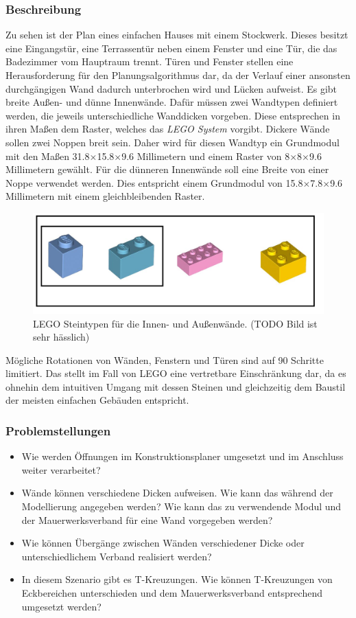 \subsubsection*{Beschreibung}
Zu sehen ist der Plan eines einfachen Hauses mit einem Stockwerk.
Dieses besitzt eine Eingangstür, eine Terrassentür neben einem Fenster und eine Tür, die das Badezimmer vom Hauptraum trennt.
Türen und Fenster stellen eine Herausforderung für den Planungsalgorithmus dar, da der Verlauf einer ansonsten durchgängigen Wand dadurch unterbrochen wird und Lücken aufweist.
Es gibt breite Außen- und dünne Innenwände.
Dafür müssen zwei Wandtypen definiert werden, die jeweils unterschiedliche Wanddicken vorgeben.
Diese entsprechen in ihren Maßen dem Raster, welches das \textit{LEGO System} vorgibt.
Dickere Wände sollen zwei Noppen breit sein.
Daher wird für diesen Wandtyp ein Grundmodul mit den Maßen 31.8$\times$15.8$\times$9.6 Millimetern und einem Raster von 8$\times$8$\times$9.6 Millimetern gewählt.
Für die dünneren Innenwände soll eine Breite von einer Noppe verwendet werden.
Dies entspricht einem Grundmodul von 15.8$\times$7.8$\times$9.6 Millimetern mit einem gleichbleibenden Raster.
\begin{figure}[!ht]
  \centering
  \includegraphics[width=0.6\columnwidth]{fig/scenario1_lego_set.png}
  \caption{LEGO Steintypen für die Innen- und Außenwände. (TODO Bild ist sehr hässlich)}\label{fig:scenarios:Scenario1 Lego Set}
\end{figure}
Mögliche Rotationen von Wänden, Fenstern und Türen sind auf 90\textdegree{} Schritte limitiert.
Das stellt im Fall von LEGO eine vertretbare Einschränkung dar, da es ohnehin dem intuitiven Umgang mit dessen Steinen und gleichzeitig dem Baustil der meisten einfachen Gebäuden entspricht.

\subsubsection*{Problemstellungen}
\begin{itemize}
  \item Wie werden Öffnungen im Konstruktionsplaner umgesetzt und im Anschluss weiter verarbeitet?
  \item Wände können verschiedene Dicken aufweisen. 
  Wie kann das während der Modellierung angegeben werden? 
  Wie kann das zu verwendende Modul und der Mauerwerksverband für eine Wand vorgegeben werden?
  \item Wie können Übergänge zwischen Wänden verschiedener Dicke oder unterschiedlichem Verband realisiert werden?
  \item In diesem Szenario gibt es T-Kreuzungen. 
  Wie können T-Kreuzungen von Eckbereichen unterschieden und dem Mauerwerksverband entsprechend umgesetzt werden? 
\end{itemize}

